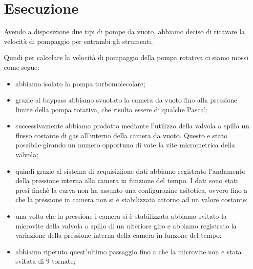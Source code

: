 \section{Esecuzione}

Avendo a disposizione due tipi di pompe da vuoto, abbiamo deciso di ricavare la velocità di pompaggio per entrambi gli strumenti.

Qundi per calcolare la velocità di pompaggio della pompa rotativa ci siamo mossi come segue:

\begin{itemize}
	\item{abbiamo isolato la pompa turbomolecolare;}
	\item{grazie al baypass abbiamo svuotato la camera da vuoto fino alla pressione limite della pompa rotativa, che risulta essere di qualche Pascal;}
	\item{successivamente abbiamo prodotto mediante l'utilizzo della valvola a spillo un flusso costante di gas all'interno della camera da vuoto. Questo e stato possibile girando un numero opportuno di vote la vite micrometrica della valvola;}
	\item{quindi grazie al sistema di acquisiziione dati abbiamo registrato l'andamento della pressione interna alla camera in funzione del tempo. I dati sono stati presi finchè la curva non ha assunto una configurazine asitotica, ovvero fino a che la pressione in camera non si è stabilizzata attorno ad un valore costante;}
	\item{una volta che la pressione i camera si è stabilizzata abbiamo svitato la microvite della valvola a spillo di un ulteriore giro e abbiamo registrato la variazione della pressione interna della camera in funzone del tempo;}
	\item{abbiamo ripetuto quest'ultimo passaggio fino a che la microvite non e stata svitata di 9 tornate;}
\end{itemize}

